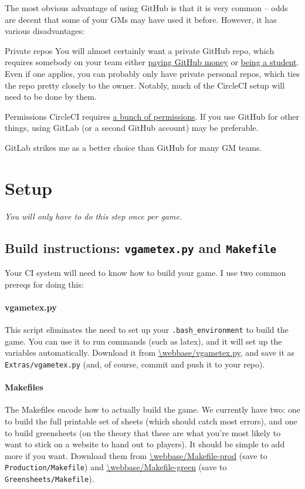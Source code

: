 \documentclass[green]{testgame}
\begin{document}
The most obvious advantage of using GitHub is that it is very common -- odds are decent that some of your GMs may have used it before. However, it has various disadvantages:
\begin{desc}
    \item[Private repos] You will almost certainly want a private GitHub repo, which requires somebody on your team either \href{https://github.com/pricing}{paying GitHub money} or \href{https://education.github.com/pack}{being a student}. Even if one applies, you can probably only have private personal repos, which ties the repo pretty closely to the owner. Notably, much of the CircleCI setup will need to be done by them.
    \item[Permissions] CircleCI requires \href{https://circleci.com/docs/github-permissions/}{a bunch of permissions}. If you use GitHub for other things, using GitLab (or a second GitHub account) may be preferable.
\end{desc}

GitLab strikes me as a better choice than GitHub for many GM teams.

\section{Setup}

\emph{You will only have to do this step once per game.}

\subsection{Build instructions: \texttt{vgametex.py} and \texttt{Makefile}}

Your CI system will need to know how to build your game. I use two common prereqs for doing this:

\paragraph*{vgametex.py} This script eliminates the need to set up your \texttt{.bash\_environment} to build the game. You can use it to run commands (such as latex), and it will set up the \GameTeX{} variables automatically. Download it from \url{\webbase/vgametex.py}, and save it as \texttt{Extras/vgametex.py} (and, of course, commit and push it to your repo).

\paragraph*{Makefiles} The Makefiles encode how to actually build the game. We currently have two: one to build the full printable set of sheets (which should catch most errors), and one to build greensheets (on the theory that these are what you're most likely to want to stick on a website to hand out to players). It should be simple to add more if you want. Download them from \url{\webbase/Makefile-prod} (save to \texttt{Production/Makefile}) and \url{\webbase/Makefile-green} (save to \texttt{Greensheets/Makefile}).
\end{document}
